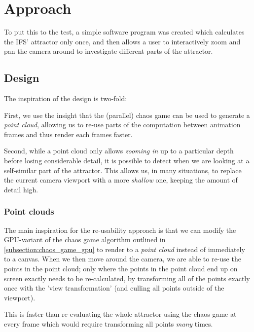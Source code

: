 \documentclass[11pt]{article}
\begin{document}

\section{Approach}
\label{sec:org83d71c9}
\label{section:approach}

To put this to the test, a simple software program was created which calculates the IFS' attractor only once,
and then allows a user to interactively zoom and pan the camera around to investigate different parts of the attractor.

\subsection{Design}
\label{sec:org4b50041}

The inspiration of the design is two-fold:

First, we use the insight that the (parallel) chaos game can be used to generate a \emph{point cloud}, allowing us to re-use parts of the computation between animation frames
and thus render each frames faster.

Second, while a point cloud only allows \emph{zooming in} up to a particular depth before losing considerable detail, 
it is possible to detect when we are looking at a self-similar part of the attractor.
This allows us, in many situations, to replace the current camera viewport with a more \emph{shallow} one, keeping the amount of detail high.

\subsubsection{Point clouds}
\label{sec:org15675e5}

The main inspiration for the re-usability approach is that we can modify the GPU-variant of the chaos game algorithm outlined in \autoref{subsection:chaos_game_gpu}
to render to a \emph{point cloud} instead of immediately to a canvas.
When we then move around the camera, we are able to re-use the points in the point cloud;
only where the points in the point cloud end up on screen exactly needs to be re-calculated, 
by transforming all of the points exactly once with the 'view transformation' 
(and culling all points outside of the viewport).

This is faster than re-evaluating the whole attractor using the chaos game at every frame which would require transforming all points \emph{many} times.
\end{document}
